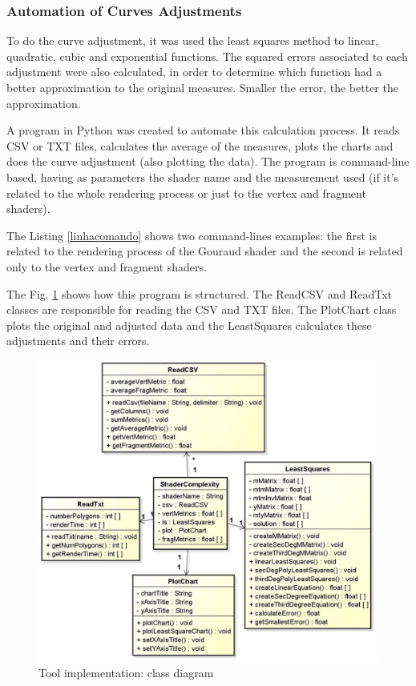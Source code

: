 \documentclass[10pt, conference, compsocconf]{IEEEtran}
\begin{document}
{\subsubsection{Automation of Curves Adjustments}

To do the curve adjustment, it was used the least squares method to linear,
quadratic, cubic and exponential functions. The squared errors associated to each
adjustment were also calculated, in order to determine which function had
a better approximation to the original measures. Smaller the error, the better the approximation.

 A program in Python was created to automate this calculation process. It reads
CSV or TXT files, calculates the average of the measures, plots the charts and
does the curve adjustment (also plotting the data). The program is command-line
based, having as parameters the shader name and the measurement used (if it's
related to the whole rendering process or just to the vertex and fragment shaders).

 The Listing \ref{linhacomando} shows two command-lines examples: the first is related
to the rendering process of the Gouraud shader and the second is related
only to the vertex and fragment shaders.



 The Fig. \ref{python} shows how this program is structured.
The ReadCSV and ReadTxt classes are responsible for reading the CSV and TXT 
files. The PlotChart class plots the original and adjusted data and the 
LeastSquares calculates these adjustments and their errors.

	\begin{figure}[!t]
	\centering
		\includegraphics[keepaspectratio=true,scale=0.28]{minquad_diag.jpg}
	\caption{Tool implementation: class diagram}
	\label{python}
	\end{figure}

}
\end{document}
